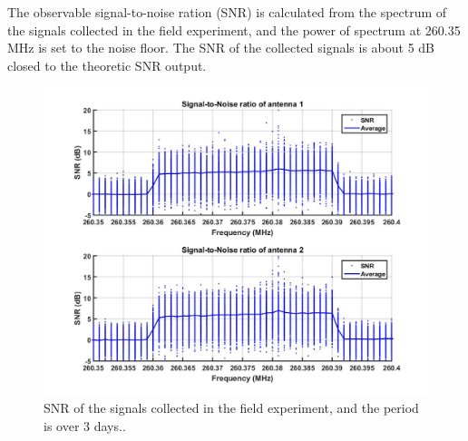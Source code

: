 \documentclass[draftcls,onecolumn]{IEEEtran}  %
\begin{document}
The observable signal-to-noise ration (SNR) is calculated from the spectrum of the signals collected in the field experiment, and the power of spectrum at 260.35 MHz is set to the noise floor. The SNR of the collected signals is about 5 dB closed to the theoretic SNR output.
\begin{figure}[h]
	\centering
	\includegraphics[width=\textwidth]{pdf/SNR.jpg}
	\caption{SNR of the signals collected in the field experiment, and the period is over 3 days..}
	\centering
	\label{fig:link_budget}
\end{figure}
\end{document}
